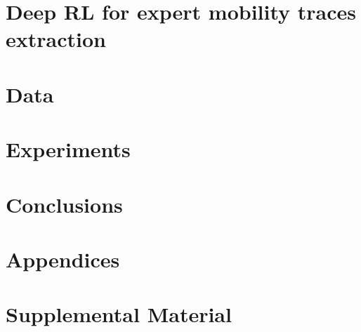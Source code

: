 \documentclass[11pt,a4paper]{article}
\begin{document}
\section{Deep RL for expert mobility traces extraction}\label{ourmethod}


\section{Data}\label{data}


\section{Experiments}\label{experiments}

\section{Conclusions}\label{conclusion}





\appendix

\section{Appendices}
\label{sec:appendix}


\section{Supplemental Material}
\label{sec:supplemental}
\end{document}
